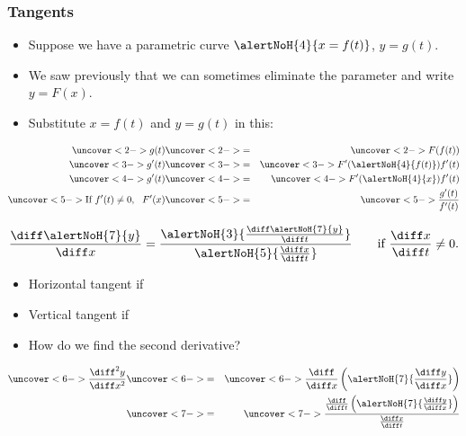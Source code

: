 \begin{frame}
\frametitle{Tangents}
\begin{itemize}
\item  Suppose we have a parametric curve $\alertNoH{ 4}{x = f(t)}$, $y = g(t)$.
\item  We saw previously that we can sometimes eliminate the parameter and write $y = F(x)$.
\item<2->  Substitute $x = f(t)$ and $y = g(t)$ in this:
\end{itemize}
\begin{eqnarray*}
\uncover<2->{%
g(t)%
}%
& \uncover<2->{ = } &%
\uncover<2->{%
F(f(t))%
}\\%
\uncover<3->{%
g'(t)%
}%
& \uncover<3->{ = } &%
\uncover<3->{%
F'(\alertNoH{ 4}{f(t)})f'(t)%
}\\%
\uncover<4->{%
g'(t)%
}%
& \uncover<4->{ = } &%
\uncover<4->{%
F'(\alertNoH{ 4}{x})f'(t)%
}\\%
\uncover<5->{%
\textrm{If } f'(t)\neq 0, \ \ F'(x)%
}%
& \uncover<5->{ = } &%
\uncover<5->{%
\frac{g'(t)}{f'(t)}%
}%
\end{eqnarray*}
%
\end{frame}


\begin{frame}
\[
\frac{\diff \alertNoH{ 7}{y}}{\diff x} = \frac{\alertNoH{ 3}{\frac{\diff \alertNoH{ 7}{y}}{\diff t}}}{\alertNoH{ 5}{\frac{\diff x}{\diff t}}}  \qquad \textrm{if} \ \frac{\diff x}{\diff t} \neq 0.%
\]
\begin{itemize}
\item<1-| alert@2-3>  Horizontal tangent if 
\item<1-| alert@4-5>  Vertical tangent if 
\item<6->  How do we find the second derivative?
\end{itemize}
\begin{eqnarray*}
\uncover<6->{%
\frac{\diff^2 y}{\diff x^2}%
}%
& \uncover<6->{ = } &%
\uncover<6->{%
\frac{\diff}{\diff x}\left( \alertNoH{ 7}{\frac{\diff y}{\diff x}}\right)%
}\\%
& \uncover<7->{ = } &%
\uncover<7->{%
\frac{\frac{\diff}{\diff t}\left( \alertNoH{ 7}{\frac{\diff y}{\diff x}}\right)}{\frac{\diff x}{\diff t}}%
}%
\end{eqnarray*}
\end{frame}
